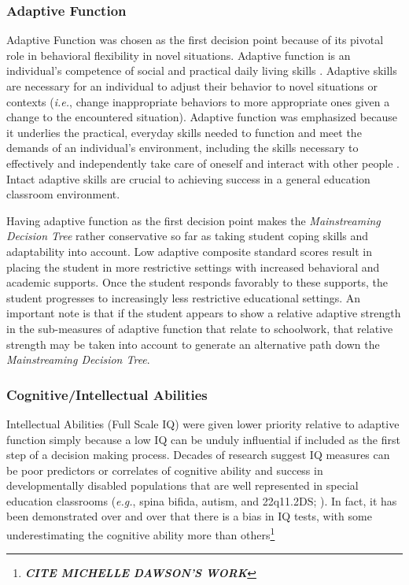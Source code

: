 \documentclass[twoside]{article}
\begin{document}
\subsubsection{Adaptive Function}
Adaptive Function was chosen as the first decision point because of its pivotal role in behavioral flexibility in novel situations. Adaptive function is an individual's competence of social and practical daily living skills \parencite{de2005adaptive,ditterline2008adaptive,gresham1987relationship}. Adaptive skills are necessary for an individual to adjust their behavior to novel situations or contexts (\textit{i.e.}, change inappropriate behaviors to more appropriate ones given a change to the encountered situation). Adaptive function was emphasized because it underlies the practical, everyday skills needed to function and meet the demands of an individual's environment, including the skills necessary to effectively and independently take care of oneself and interact with other people \parencite{oakland2011adaptive}. Intact adaptive skills are crucial to achieving success in a general education classroom environment. 

Having adaptive function as the first decision point makes the \textit{Mainstreaming Decision Tree} rather conservative so far as taking student coping skills and adaptability into account. Low adaptive composite standard scores result in placing the student in more restrictive settings with increased behavioral and academic supports. Once the student responds favorably to these supports, the student progresses to increasingly less restrictive educational settings. An important note is that if the student appears to show a relative adaptive strength in the sub-measures of adaptive function that relate to schoolwork, that relative strength may be taken into account to generate an alternative path down the \textit{Mainstreaming Decision Tree}. 

\subsubsection{Cognitive/Intellectual Abilities}
Intellectual Abilities (Full Scale IQ) were given lower priority relative to adaptive function simply because a low IQ can be unduly influential if included as the first step of a decision making process. Decades of research suggest IQ measures can be poor predictors or correlates of cognitive ability and success in developmentally disabled populations that are well represented in special education classrooms (\textit{e.g.}, spina bifida, autism, and 22q11.2DS; \parencite{biswas2016cognitive,dennis2009iq,popa2014atypical,nader2014does}). In fact, it has been demonstrated over and over that there is a bias in IQ tests, with some underestimating the cognitive ability more than others\footnote{\textbf{\textit{CITE MICHELLE DAWSON'S WORK}}}
\end{document}
